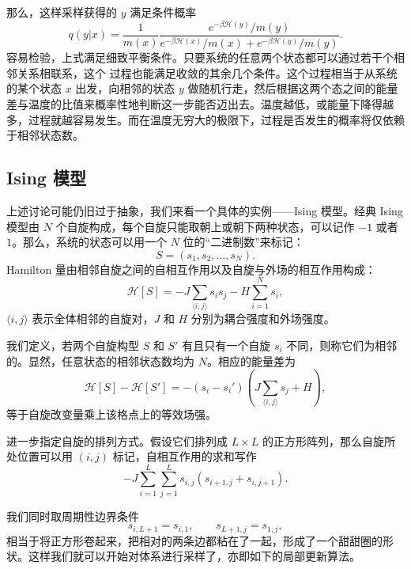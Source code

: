那么，这样采样获得的 $y$ 满足条件概率
\begin{equation}
 q(y|x)=\frac1{m(x)}\frac{e^{-\beta\mathcal H(y)}/m(y)}
 {e^{-\beta\mathcal H(x)}/m(x)+e^{-\beta\mathcal H(y)}/m(y)}.
\tag{7.3.9}
\end{equation}
容易检验，上式满足细致平衡条件。只要系统的任意两个状态都可以通过若干个相邻关系相联系，这个  过程也能满足收敛的其余几个条件。这个过程相当于从系统的某个状态 $x$ 出发，向相邻的状态 $y$ 做随机行走，然后根据这两个态之间的能量差与温度的比值来概率性地判断这一步能否迈出去。温度越低，或能量下降得越多，过程就越容易发生。而在温度无穷大的极限下，过程是否发生的概率将仅依赖于相邻状态数。

\subsection{Ising 模型}

上述讨论可能仍旧过于抽象，我们来看一个具体的实例——Ising 模型。经典 Ising 模型由 $N$ 个自旋构成，每个自旋只能取朝上或朝下两种状态，可以记作 $-1$ 或者 $1$。那么，系统的状态可以用一个 $N$ 位的“二进制数”来标记：
\begin{equation}
 S=(s_1,s_2,\ldots,s_N).
\tag{7.3.10}
\end{equation}
Hamilton 量由相邻自旋之间的自相互作用以及自旋与外场的相互作用构成：
\begin{equation}
 \mathcal H[S]=-J\sum_{\langle i,j\rangle}s_is_j-H\sum_{i=1}^{N}s_i,
\tag{7.3.11}
\end{equation}
$\langle i,j\rangle$ 表示全体相邻的自旋对，$J$ 和 $H$ 分别为耦合强度和外场强度。

我们定义，若两个自旋构型 $S$ 和 $S'$ 有且只有一个自旋 $s_i$ 不同，则称它们为相邻的。显然，任意状态的相邻状态数均为 $N$。相应的能量差为
\begin{equation}
 \mathcal H[S]-\mathcal H[S']
 =-(s_i-s_i')\left(J\sum_{\langle i,j\rangle}s_j+H\right),
\tag{7.3.12}
\end{equation}
等于自旋改变量乘上该格点上的等效场强。

进一步指定自旋的排列方式。假设它们排列成 $L\times L$ 的正方形阵列，那么自旋所处位置可以用 $(i,j)$ 标记，自相互作用的求和写作
\begin{equation}
 -J\sum_{i=1}^{L}\sum_{j=1}^{L}s_{i,j}(s_{i+1,j}+s_{i,j+1}).
\tag{7.3.13}
\end{equation}

我们同时取周期性边界条件
\begin{equation}
 s_{i,L+1}=s_{i,1},\qquad s_{L+1,j}=s_{1,j},
\tag{7.3.14}
\end{equation}
相当于将正方形卷起来，把相对的两条边都粘在了一起，形成了一个甜甜圈的形状。这样我们就可以开始对体系进行采样了，亦即如下的局部更新算法。

